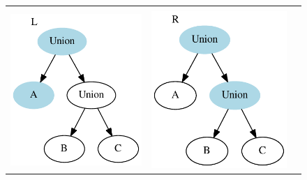 \documentclass[a4paper,english]{lipics-v2018}
\begin{document}
\begin{figure}
\begin{tabular}{cccc}
& \hspace{5em} & &\\
\includegraphics[scale=0.6]{figures-gen/example1.pdf} &
\multicolumn{2}{c}{\includegraphics[scale=0.6]{figures-gen/example2.pdf}} &

\end{tabular}
\end{figure}
\end{document}
